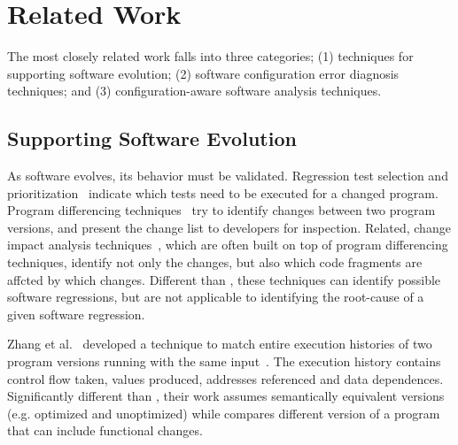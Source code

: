 \section{Related Work}
\label{sec:related}

The most closely related work falls into
three categories; (1) techniques for
supporting software evolution; (2) software
configuration error diagnosis techniques;
and (3) configuration-aware software analysis techniques.

\subsection{Supporting Software Evolution}

As software evolves, its behavior must be validated.
Regression test selection and prioritization~\cite{}
indicate which tests need to be executed for a changed
program.  Program differencing techniques~\cite{Giroux:2006:DIF, Xing:2005:UAO, Thummalapenta:2010:ESM, Kim:2013, Jin:2012:BRF,Nguyen:2010:RBF,Dig:2006:ADR, Kamiya:2002:CMT}
try to identify changes between two program versions,
and present the change list to developers for inspection.
Related, change impact analysis techniques~\cite{}, which
are often built on top of program differencing
techniques, identify not only the changes, but also
which code fragments are affcted by which changes. 
Different than \ourtool, these techniques can identify possible
software regressions, but are not applicable to
identifying the root-cause of a given software regression.

Zhang et al.~\cite{} developed a technique to match entire
execution histories of two program versions running with
the same input~\cite{}. The execution history contains control
flow taken, values produced, addresses referenced and
data dependences. Significantly different than \ourtool, their
work assumes semantically equivalent versions (e.g. optimized
and unoptimized) while \ourtool compares different version of
a program that can include functional changes. 

